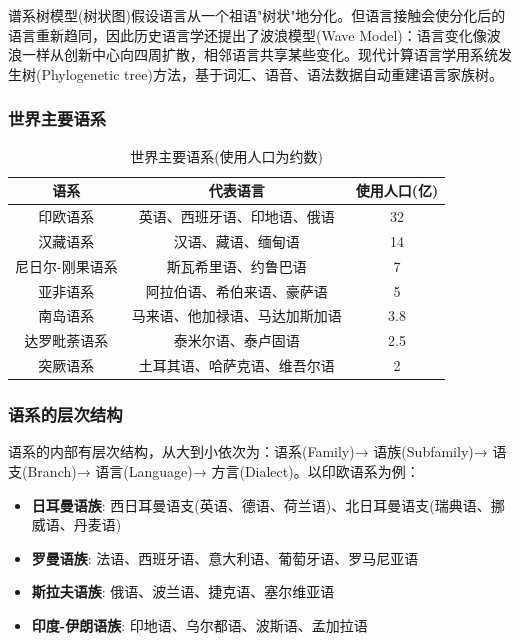 谱系树模型(树状图)假设语言从一个祖语"树状"地分化。但语言接触会使分化后的语言重新趋同，因此历史语言学还提出了波浪模型(Wave Model)：语言变化像波浪一样从创新中心向四周扩散，相邻语言共享某些变化。现代计算语言学用系统发生树(Phylogenetic tree)方法，基于词汇、语音、语法数据自动重建语言家族树。

\subsubsection{世界主要语系}

\begin{table}[H]
\centering
\caption{世界主要语系(使用人口为约数)}
\begin{tabulary}{\textwidth}{@{}CCC@{}}
\toprule
\textbf{语系} & \textbf{代表语言} & \textbf{使用人口(亿)} \\
\midrule
印欧语系 & 英语、西班牙语、印地语、俄语 & 32 \\
汉藏语系 & 汉语、藏语、缅甸语 & 14 \\
尼日尔-刚果语系 & 斯瓦希里语、约鲁巴语 & 7 \\
亚非语系 & 阿拉伯语、希伯来语、豪萨语 & 5 \\
南岛语系 & 马来语、他加禄语、马达加斯加语 & 3.8 \\
达罗毗荼语系 & 泰米尔语、泰卢固语 & 2.5 \\
突厥语系 & 土耳其语、哈萨克语、维吾尔语 & 2 \\
\bottomrule
\end{tabulary}
\end{table}

\subsubsection{语系的层次结构}

语系的内部有层次结构，从大到小依次为：语系(Family)→ 语族(Subfamily)→ 语支(Branch)→ 语言(Language)→ 方言(Dialect)。以印欧语系为例：
\begin{itemize}
    \item \textbf{日耳曼语族}: 西日耳曼语支(英语、德语、荷兰语)、北日耳曼语支(瑞典语、挪威语、丹麦语)
    \item \textbf{罗曼语族}: 法语、西班牙语、意大利语、葡萄牙语、罗马尼亚语
    \item \textbf{斯拉夫语族}: 俄语、波兰语、捷克语、塞尔维亚语
    \item \textbf{印度-伊朗语族}: 印地语、乌尔都语、波斯语、孟加拉语
\end{itemize}

